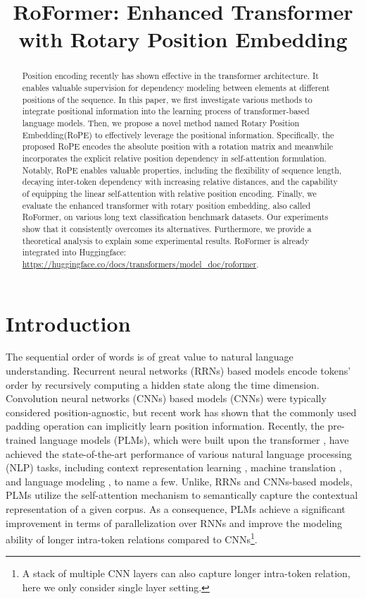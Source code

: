 \title{RoFormer: Enhanced Transformer with Rotary Position Embedding}

\begin{abstract}
Position encoding recently has shown effective in the transformer architecture. It enables valuable supervision for dependency modeling between elements at different positions of the sequence. In this paper, we first investigate various methods to integrate positional information into the learning process of transformer-based language models. Then, we propose a novel method named Rotary Position Embedding(RoPE) to effectively leverage the positional information. Specifically, the proposed RoPE encodes the absolute position with a rotation matrix and meanwhile incorporates the explicit relative position dependency in self-attention formulation. Notably, RoPE enables valuable properties, including the flexibility of sequence length, decaying inter-token dependency with increasing relative distances, and the capability of equipping the linear self-attention with relative position encoding. Finally, we evaluate the enhanced transformer with rotary position embedding, also called RoFormer, on various long text classification benchmark datasets. Our experiments show that it consistently overcomes its alternatives. Furthermore, we provide a theoretical analysis to explain some experimental results. RoFormer is already integrated into Huggingface: \url{https://huggingface.co/docs/transformers/model_doc/roformer}.
\end{abstract}

\section{Introduction}
The sequential order of words is of great value to natural language understanding. Recurrent neural networks (RRNs) based models encode tokens' order by recursively computing a hidden state along the time dimension.  Convolution neural networks (CNNs) based models (CNNs) \cite{Gehring:2017} were typically considered position-agnostic, but recent work \cite{Islam2020HowMP} has shown that the commonly used padding operation can implicitly learn position information. Recently,  the pre-trained language models (PLMs), which were built upon the transformer \cite{Vaswani:2017}, have achieved the state-of-the-art performance of various natural language processing (NLP) tasks, including context representation learning \cite{Devlin2019BERTPO}, machine translation \cite{Vaswani:2017}, and language modeling \cite{Radford2019LanguageMA}, to name a few.  Unlike, RRNs and CNNs-based models, PLMs utilize the self-attention mechanism to semantically capture the contextual representation of a given corpus. As a consequence, PLMs achieve a significant improvement in terms of parallelization over RNNs and improve the modeling ability of longer intra-token relations compared to CNNs\footnote{A stack of multiple CNN layers can also capture longer intra-token relation, here we only consider single layer setting.}. 

